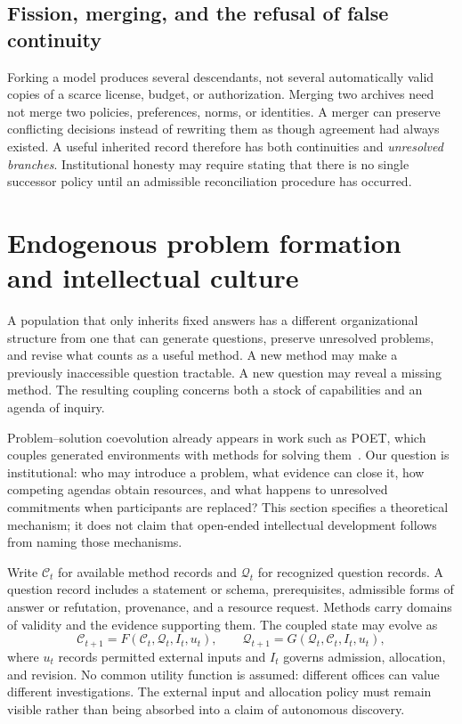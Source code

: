 \documentclass[11pt,letterpaper]{article}
\theoremstyle{plain}
\theoremstyle{definition}
\theoremstyle{remark}
\begin{document}
\subsection{Fission, merging, and the refusal of false continuity}

Forking a model produces several descendants, not several automatically valid copies of a scarce license, budget, or authorization. Merging two archives need not merge two policies, preferences, norms, or identities. A merger can preserve conflicting decisions instead of rewriting them as though agreement had always existed. A useful inherited record therefore has both continuities and \emph{unresolved branches}. Institutional honesty may require stating that there is no single successor policy until an admissible reconciliation procedure has occurred.


\section{Endogenous problem formation and intellectual culture}\label{sec:agendas}
A population that only inherits fixed answers has a different organizational structure from one that can generate questions, preserve unresolved problems, and revise what counts as a useful method. A new method may make a previously inaccessible question tractable. A new question may reveal a missing method. The resulting coupling concerns both a stock of capabilities and an agenda of inquiry.

Problem--solution coevolution already appears in work such as POET, which couples generated environments with methods for solving them~\cite{poet}. Our question is institutional: who may introduce a problem, what evidence can close it, how competing agendas obtain resources, and what happens to unresolved commitments when participants are replaced? This section specifies a theoretical mechanism; it does not claim that open-ended intellectual development follows from naming those mechanisms.

Write $\mathcal C_t$ for available method records and $\mathcal Q_t$ for recognized question records. A question record includes a statement or schema, prerequisites, admissible forms of answer or refutation, provenance, and a resource request. Methods carry domains of validity and the evidence supporting them. The coupled state may evolve as
\[
\mathcal C_{t+1}=F(\mathcal C_t,\mathcal Q_t,I_t,u_t),\qquad
\mathcal Q_{t+1}=G(\mathcal Q_t,\mathcal C_t,I_t,u_t),
\]
where $u_t$ records permitted external inputs and $I_t$ governs admission, allocation, and revision. No common utility function is assumed: different offices can value different investigations. The external input and allocation policy must remain visible rather than being absorbed into a claim of autonomous discovery.
\end{document}

